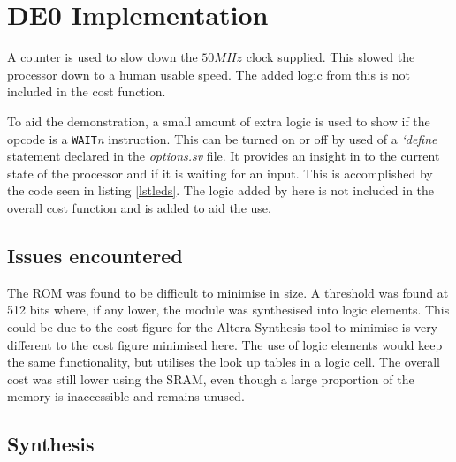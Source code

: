 
\section{DE0 Implementation}\label{sect:de0}



A counter is used to slow down the $50MHz$ clock supplied.%
This slowed the processor down to a human usable speed.
The added logic from this is not included in the cost function.


To aid the demonstration, a small amount of extra logic is used to show if the opcode is a \texttt{WAIT}\textit{n} instruction. 
This can be turned on or off by used of a \textit{`define} statement declared in the \textit{options.sv} file.
It provides an insight in to the current state of the processor and if it is waiting for an input.
This is accomplished by the code seen in listing \ref{lstleds}.
	The logic added by here is not included in the overall cost function and is added to aid the use. 




\subsection{Issues encountered}

The ROM was found to be difficult to minimise in size. 
A threshold was found at 512 bits where, if any lower, the module was synthesised into logic elements. 
This could be due to the cost figure for the Altera Synthesis tool to minimise is very different to the cost figure minimised here. 
The use of logic elements would keep the same functionality, but utilises the look up tables in a logic cell. 
The overall cost was still lower using the SRAM, even though a large proportion of the memory is inaccessible and remains unused.

\subsection{Synthesis}

